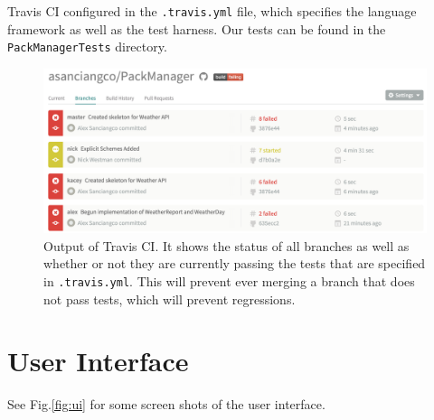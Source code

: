 \documentclass[11pt]{article}
\begin{document}
Travis CI configured in the \texttt{.travis.yml} file, which specifies the language framework as well as the test harness. Our tests can be found in the \texttt{PackManagerTests} directory. 


\begin{figure}
\centering
\includegraphics[width=\linewidth]{img/travis.png}
\caption{Output of Travis CI. It shows the status of all branches as well as whether or not they are currently passing the tests that are specified in \texttt{.travis.yml}. This will prevent ever merging a branch that does not pass tests, which will prevent regressions.}
\label{fig:travis}
\end{figure}

\section{User Interface}
See Fig.\ref{fig:ui} for some screen shots of the user interface.
\end{document}
